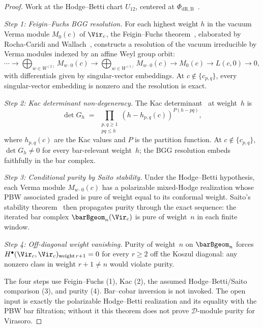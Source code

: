 \begin{proof}
Work at the Hodge--Betti chart $U_{12}$, centered at
$\Phi_{\mathrm{dR,B}}$~\cite{Deligne89}.

\emph{Step 1: Feigin--Fuchs BGG resolution.}
For each highest weight $h$ in the vacuum Verma module
$M_0(c)$ of $\Vir_c$, the Feigin--Fuchs
theorem~\cite{FeiginFuchs90}, elaborated by
Rocha-Caridi and Wallach~\cite{RCW82}, constructs a resolution
of the vacuum irreducible by Verma modules indexed by an affine
Weyl group orbit:
\[
\cdots \to
\bigoplus_{w \in W^{(2)}} M_{w \cdot 0}(c) \to
\bigoplus_{w \in W^{(1)}} M_{w \cdot 0}(c) \to
M_0(c) \to L(c,0) \to 0,
\]
with differentials given by singular-vector embeddings. At
$c \notin \{c_{p,q}\}$, every singular-vector embedding is
nonzero and the resolution is exact.

\emph{Step 2: Kac determinant non-degeneracy.}
The Kac determinant~\cite{KacBook,FeiginFuchs90} at weight~$h$ is
\[
\det G_h
\;=\; \prod_{\substack{p,q \geq 1 \\ pq \leq h}}
(h - h_{p,q}(c))^{P(h - pq)},
\]
where $h_{p,q}(c)$ are the Kac values and $P$ is the partition
function. At $c \notin \{c_{p,q}\}$, $\det G_h \neq 0$ for every
bar-relevant weight~$h$; the BGG resolution embeds faithfully in
the bar complex.

\emph{Step 3: Conditional purity by Saito stability.}
Under the Hodge--Betti hypothesis, each Verma module $M_{w\cdot 0}(c)$
has a polarizable mixed-Hodge realization whose PBW associated graded is
pure of weight equal to its conformal weight. Saito's stability
theorem~\cite{Saito} then propagates purity through the exact sequence:
the iterated bar complex $\barBgeom_n(\Vir_c)$ is pure of weight~$n$ in
each finite window.

\emph{Step 4: Off-diagonal weight vanishing.}
Purity of weight~$n$ on $\barBgeom_n$ forces
$H^\bullet(\Vir_c, \Vir_c)_{\mathrm{weight}\,r+1} = 0$ for every
$r \geq 2$ off the Koszul diagonal: any nonzero class in weight
$r + 1 \neq n$ would violate purity.

The four steps use Feigin--Fuchs (1), Kac (2), the assumed
Hodge--Betti/Saito comparison (3), and purity (4). Bar--cobar inversion
is not invoked. The open input is exactly the polarizable
Hodge--Betti realization and its equality with the PBW bar filtration;
without it this theorem does not prove $\mathcal D$-module purity for
Virasoro.
\end{proof}

